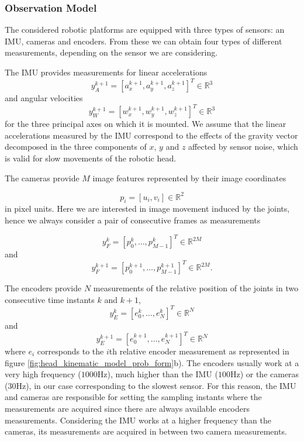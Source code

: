 \subsubsection{Observation Model}

The considered robotic platforms are equipped with three types of sensors: an IMU, cameras and encoders. From these we can obtain four types of different measurements, depending on the sensor we are considering.

The IMU provides measurements for linear accelerations
\begin{equation}
y_{A}^{k+1}=\left[a_{x}^{k+1},a_{y}^{k+1},a_{z}^{k+1}\right]^{T}\in{\mathbb{R}}^{3}
\end{equation}
and angular velocities
\begin{equation}
y_{W}^{k+1}=\left[w_{x}^{k+1},w_{y}^{k+1},w_{z}^{k+1}\right]^{T}\in{\mathbb{R}}^{3}
\end{equation}
for the three principal axes on which it is mounted. We assume that the linear accelerations measured by the IMU correspond to the effects of the gravity vector decomposed in the three components of $x$, $y$ and $z$ affected by sensor noise, which is valid for slow movements of the robotic head. 

The cameras provide $M$ image features represented by their image coordinates

\begin{equation}
p_{i}=\left[u_{i},v_{i}\right]\in{\mathbb{R}}^{2}
\end{equation}
in pixel units. Here we are interested in image movement induced by the joints, hence we always consider a pair of consecutive frames as measurements

\begin{equation}
y_{F}^{k}=\left[p_{0}^{k},\ldots,p_{M-1}^{k}\right]^{T}\in{\mathbb{R}}^{2M}
\end{equation}
and
\begin{equation}
y_{F}^{k+1}=\left[p_{0}^{k+1},\ldots,p_{M-1}^{k+1}\right]^{T}\in{\mathbb{R}}^{2M}.
\end{equation}

The encoders provide $N$ measurements of the relative position of the joints in two consecutive time instants $k$ and $k+1$, 
\begin{equation}
y_{E}^{k}=\left[e_{0}^{k},\ldots,e_{N}^{k}\right]^{T}\in{\mathbb{R}}^{N}
\end{equation}
and 
\begin{equation}
y_{E}^{k+1}=\left[e_{0}^{k+1},\ldots,e_{N}^{k+1}\right]^{T}\in{\mathbb{R}}^{N}
\end{equation}
where $e_i$ corresponds to the $i$th relative encoder measurement as represented in figure \ref{fig:head_kinematic_model_prob_form}b). The encoders usually work at a very high frequency ($1000$Hz), much higher than the IMU ($100$Hz) or the cameras ($30$Hz), in our case corresponding to the slowest sensor. For this reason, the IMU and cameras are responsible for setting the sampling instants where the measurements are acquired since there are always available encoders measurements. Considering the IMU works at a higher frequency than the cameras, its measurements are acquired in between two camera measurements.

